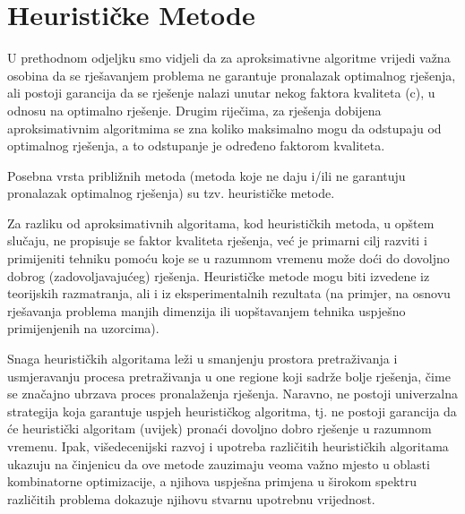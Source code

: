 \documentclass[a4paper, utf8, 11pt, colorlinks]{book}
\begin{document}

  
\section{Heurističke Metode}
 U prethodnom odjeljku smo vidjeli da za aproksimativne algoritme vrijedi važna osobina da se rješavanjem problema ne garantuje pronalazak optimalnog rješenja, ali postoji garancija da se rješenje nalazi unutar nekog faktora kvaliteta (c), u odnosu na optimalno rješenje. 
 Drugim riječima, za rješenja dobijena aproksimativnim algoritmima se zna koliko maksimalno mogu da odstupaju od optimalnog rješenja, a to odstupanje je određeno faktorom kvaliteta.
 
 Posebna vrsta približnih metoda (metoda koje ne daju i/ili ne garantuju pronalazak optimalnog rješenja) su tzv. heurističke metode. 
 
 Za razliku od aproksimativnih algoritama, kod heurističkih metoda, u opštem slučaju, ne propisuje se faktor kvaliteta rješenja, već je primarni cilj razviti i primijeniti tehniku pomoću koje se u razumnom vremenu može doći do dovoljno dobrog (zadovoljavajućeg) rješenja. Heurističke metode mogu biti izvedene iz teorijskih razmatranja, ali i iz eksperimentalnih rezultata (na primjer, na osnovu rješavanja problema manjih dimenzija ili uopštavanjem tehnika uspješno primijenjenih na uzorcima). 
 
 
 Snaga heurističkih algoritama leži u smanjenju prostora pretraživanja i usmjeravanju procesa pretraživanja u one regione koji sadrže bolje rješenja, čime se značajno ubrzava proces pronalaženja rješenja. Naravno, ne postoji univerzalna strategija koja garantuje uspjeh heurističkog algoritma, tj. ne postoji garancija da će heuristički algoritam (uvijek) pronaći dovoljno dobro rješenje u razumnom vremenu. Ipak, višedecenijski razvoj i upotreba različitih heurističkih algoritama ukazuju na činjenicu da ove metode zauzimaju veoma važno mjesto u oblasti kombinatorne optimizacije, a njihova uspješna primjena u širokom spektru različitih problema dokazuje njihovu stvarnu upotrebnu vrijednost.
 
\end{document}
